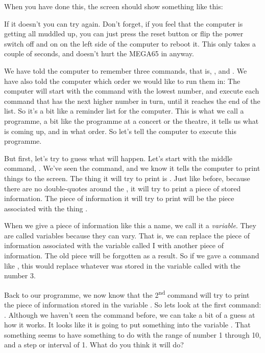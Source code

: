 \needspace{4cm} %
When you have done this, the screen should show something like this:


If it doesn't you
can try again. Don't forget, if you feel that the computer is getting all muddled up,
you can just press the reset button or flip the power switch off and on on the left side of the
computer to reboot it. This only takes a couple of seconds, and doesn't hurt the MEGA65
in anyway.

We have told the computer to remember three commands, that is, ,
and .  We have also told the computer which order we would like to run them in: The
computer will start with the command with the lowest number, and execute each command that
has the next higher number in turn, until it reaches the end of the list.  So it's a bit like
a reminder list for the computer. This is what we call a programme, a bit like the programme at
a concert or the theatre, it tells us what is coming up, and in what order.
So let's tell the computer to execute this programme.

But first, let's try to guess what will happen.  Let's start with the middle command, .
We've seen the  command, and we know it tells the computer to print things to the screen.
The thing it will try to print is .  Just like before, because there are no double-quotes
around the , it will try to print a piece of stored information.  The piece of information
it will try to print will be the piece associated with the thing .

When we give a piece of
information like this a name, we call it a {\em variable}.  They are called
variables because they can vary.  That is, we can replace the piece of information associated
with the variable called I with another piece of information.  The old piece will be forgotten
as a result.  So if we gave a command like , this would replace whatever was stored
in the variable called  with the number 3.

Back to our programme, we now know that the 2\textsuperscript{nd} command will try to print the piece of information
stored in the variable .  So lets look at the first command: .  Although
we haven't seen the  command before, we can take a bit of a guess at how it works. It looks like
it is going to put something into the variable .  That something seems to have something to do
with the range of number 1 through 10, and a step or interval of 1.  What do you think it will do?

